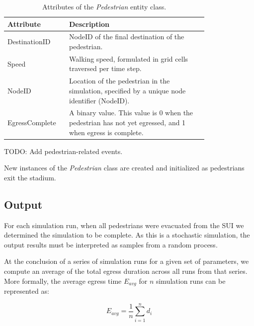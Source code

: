\documentclass[12pt]{article}
\begin{document}
\def\arraystretch{1.5}
\begin{table}[hb!]
  \centering
    \begin{tabular}{p{0.2\linewidth}p{0.6\linewidth}}
     \hline
     Attribute & Description \\
     \hline
     DestinationID  & NodeID of the final destination of the pedestrian. \\
     Speed          & Walking speed, formulated in grid cells traversed per
                      time step. \\
     NodeID         & Location of the pedestrian in the simulation, specified
                      by a unique node identifier (NodeID). \\
     EgressComplete & A binary value. This value is 0 when the pedestrian has
                      not yet egressed, and 1 when egress is complete. \\
     \hline
    \end{tabular}
    \caption{Attributes of the \textit{Pedestrian} entity class.}
  \label{table:ped}
\end{table}

TODO: Add pedestrian-related events.

New instances of the \textit{Pedestrian} class are created and initialized
as pedestrians exit the stadium.

\subsection{Output}
For each simulation run, when all pedestrians were evacuated from the SUI we
determined the simulation to be complete. As this is a stochastic simulation,
the output results must be interpreted as samples from a random process.

At the conclusion of a series of simulation runs for a given set of parameters,
we compute an average of the total egress duration across all runs from that
series. More formally, the average egress time $E_{avg}$ for $n$ simulation runs
can be represented as:

\begin{equation}
E_{avg} = \frac{1}{n}\sum\limits_{i=1}^n d_i
\end{equation}
\end{document}
